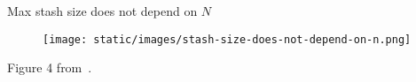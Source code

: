 \begin{frame}{Max stash size does not depend on $N$}
	
	\begin{center}

		\begin{figure}

			\texttt{[image: static/images/stash-size-does-not-depend-on-n.png]}

		\end{figure}

	\end{center}

	Figure 4 from~\cite{Stefanov:2013:POE:2508859.2516660}.

\end{frame}
